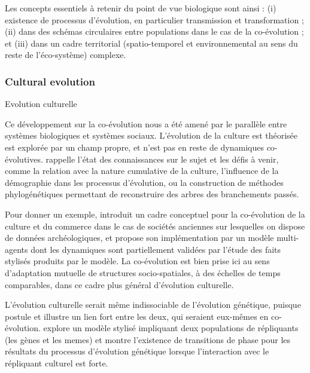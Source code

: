 Les concepts essentiels à retenir du point de vue biologique sont ainsi : (i) existence de processus d'évolution, en particulier transmission et transformation ; (ii) dans des schémas circulaires entre populations dans le cas de la co-évolution ; et (iii) dans un cadre territorial (spatio-temporel et environnemental au sens du reste de l'éco-système) complexe.


\subsubsection{Cultural evolution}{Evolution culturelle}


Ce développement sur la co-évolution nous a été amené par le parallèle entre systèmes biologiques et systèmes sociaux. L'évolution de la culture est théorisée est explorée par un champ propre, et n'est pas en reste de dynamiques co-évolutives. \cite{Mesoudi25072017} rappelle l'état des connaissances sur le sujet et les défis à venir, comme la relation avec la nature cumulative de la culture, l'influence de la démographie dans les processus d'évolution, ou la construction de méthodes phylogénétiques permettant de reconstruire des arbres des branchements passés.

Pour donner un exemple, \cite{carrignon2015modelling} introduit un cadre conceptuel pour la co-évolution de la culture et du commerce dans le cas de sociétés anciennes sur lesquelles on dispose de données archéologiques, et propose son implémentation par un modèle multi-agents dont les dynamiques sont partiellement validées par l'étude des faits stylisés produits par le modèle. La co-évolution est bien prise ici au sens d'adaptation mutuelle de structures socio-spatiales, à des échelles de temps comparables, dans ce cadre plus général d'évolution culturelle.


L'évolution culturelle serait même indissociable de l'évolution génétique, puisque \cite{durham1991coevolution} postule et illustre un lien fort entre les deux, qui seraient eux-mêmes en co-évolution. \cite{bull2000meme} explore un modèle stylisé impliquant deux populations de répliquants (les gènes et les memes) et montre l'existence de transitions de phase pour les résultats du processus d'évolution génétique lorsque l'interaction avec le répliquant culturel est forte.



